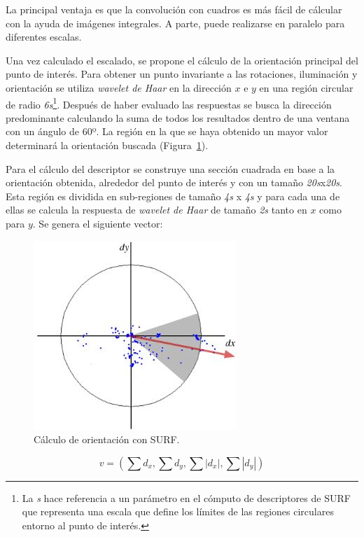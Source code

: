 La principal ventaja es que la convolución con cuadros es más fácil de cálcular con la ayuda de imágenes integrales. A parte, puede realizarse en paralelo para diferentes escalas.

Una vez calculado el escalado, se propone el cálculo de la orientación principal del punto de interés. Para obtener un punto invariante a las rotaciones, iluminación y orientación se utiliza \textit{wavelet de Haar} en la dirección $x$ e $y$ en una región circular de radio \textit{6s}\footnote{La \textit{s} hace referencia a un parámetro en el cómputo de descriptores de SURF que representa una escala que define los límites de las regiones circulares entorno al punto de interés.}. Después de haber evaluado las respuestas se busca la dirección predominante calculando la suma de todos los resultados dentro de una ventana con un ángulo de 60º. La región en la que se haya obtenido un mayor valor determinará la orientación buscada (Figura~\ref{fig:surf2}).

Para el cálculo del descriptor se construye una sección cuadrada en base a la orientación obtenida, alrededor del punto de interés y con un tamaño \textit{20s}x\textit{20s}. Esta región es dividida en sub-regiones de tamaño \textit{4s} x \textit{4s} y para cada una de ellas se calcula la respuesta de \textit{wavelet de Haar} de tamaño \textit{2s} tanto en $x$ como para $y$. Se genera el siguiente vector:

\begin{figure}[ht]
\centering
\includegraphics[scale=0.5]{Figures/surf-2.jpg}
\decoRule
\caption[Cálculo de orientación con SURF]{Cálculo de orientación con SURF.}
\label{fig:surf2}
\end{figure}

\begin{equation}
v=\left(\sum d_{x},\sum d_{y},\sum|d_{x}|,\sum|d_{y}|\right)
\end{equation}

